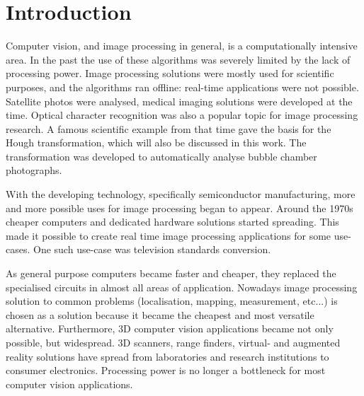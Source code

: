 \chapter*{Introduction}

Computer vision, and image processing in general, is a computationally intensive area.
In the past the use of these algorithms was severely limited by the lack of processing power.
Image processing solutions were mostly used for scientific purposes, and the algorithms ran offline: real-time applications were not possible.
Satellite photos were analysed, medical imaging solutions were developed at the time.
Optical character recognition was also a popular topic for image processing research.
A famous scientific example from that time gave the basis for the Hough transformation, which will also be discussed in this work.
The transformation was developed to automatically analyse bubble chamber photographs.

With the developing technology, specifically semiconductor manufacturing, more and more possible uses for image processing began to appear.
Around the 1970s cheaper computers and dedicated hardware solutions started spreading.
This made it possible to create real time image processing applications for some use-cases.
One such use-case was television standards conversion.

As general purpose computers became faster and cheaper, they replaced the specialised circuits in almost all areas of application.
Nowadays image processing solution to common problems (localisation, mapping, measurement, etc...) is chosen as a solution because it became the cheapest and most versatile alternative.
Furthermore, 3D computer vision applications became not only possible, but widespread.
3D scanners, range finders, virtual- and augmented reality solutions have spread from laboratories and research institutions to consumer electronics.
Processing power is no longer a bottleneck for most computer vision applications.

